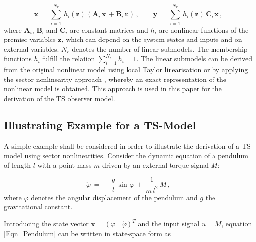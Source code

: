 \documentclass[a4paper]{article}
\newcommand{\xP}{\dot{x}}
\newcommand{\B}[1]{\mathbf{#1}}
\begin{document}
\begin{equation}
 \B{\xP} \, = \, \sum\limits_{i=1}^{N_r} \, h_i(\B{z})\, \left(\B{A}_i \, \B{x} \, + \B{B}_i \, \B{u}\right) \, , \qquad
 \B{y}	 \, = \, \sum\limits_{i=1}^{N_r} \, h_i(\B{z})\, \B{C}_i \, \B{x} \, ,
\label{Eqn_ZustModel_TS}
\end{equation}
\newline where $\B{A}_i$, $\B{B}_i$ and $\B{C}_i$ are constant matrices and $h_i$ are nonlinear functions of the premise variables $\B{z}$, which can depend on the system states and inputs and on external variables. $N_r$ denotes the number of linear submodels. The membership functions $h_i$ fulfill the relation $\sum_{i=1}^{N_r} h_i = 1$. The linear submodels can be derived from the original nonlinear model using local Taylor linearisation or by applying the sector nonlinearity approach \cite{TanakaSano2:1994,Tanaka:2001}, whereby an exact representation of the nonlinear model is obtained. This approach is used in this paper for the derivation of the TS observer model.


\newpage

\subsection{\label{Sec_TSExample}Illustrating Example for a TS-Model}

A simple example shall be considered in order to illustrate the derivation of a TS model using sector nonlinearities.
\newline Consider the dynamic equation of a pendulum of length $l$ with a point mass $m$ driven by an external torque signal $M$:

\begin{equation}
\ddot{\varphi} \, = \, -\frac{g}{l}\,\sin\,\varphi \, + \, \frac{1}{m\,l^2} \, M \, ,
\label{Eqn_Pendulum}
\end{equation}
\newline where $\varphi$ denotes the angular displacement of the pendulum and $g$ the gravitational constant.

Introducing the state vector $\B{x} = \left(\varphi \quad \dot{\varphi}\right)^T$ and the input signal $u = M$, equation \eqref{Eqn_Pendulum} can be written in state-space form as
\end{document}
